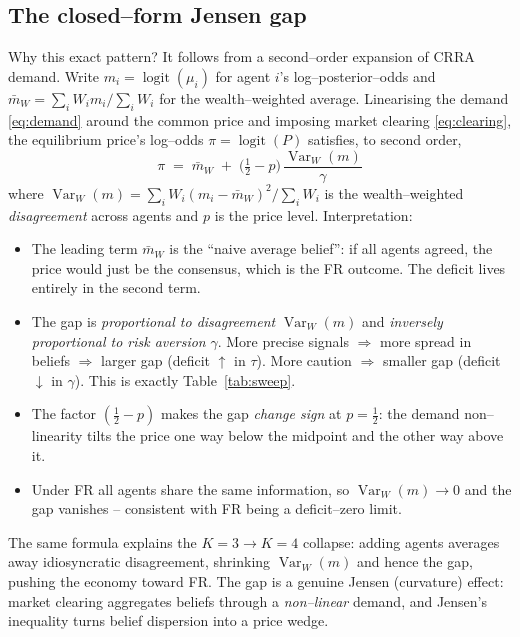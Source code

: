 \documentclass[11pt]{article}
\newcommand{\Var}{\operatorname{Var}}
\newcommand{\logit}{\operatorname{logit}}
\begin{document}
\subsection{The closed--form Jensen gap}

Why this exact pattern? It follows from a second--order expansion of CRRA
demand. Write $m_i=\logit(\mu_i)$ for agent $i$'s log--posterior--odds and
$\bar m_W=\sum_i W_i m_i/\sum_i W_i$ for the wealth--weighted average.
Linearising the demand \eqref{eq:demand} around the common price and
imposing market clearing \eqref{eq:clearing}, the equilibrium price's
log--odds $\pi=\logit(P)$ satisfies, to second order,
\begin{equation}
  \boxed{\;
  \pi \;=\; \bar m_W \;+\;
  \Big(\tfrac12-p\Big)\,\frac{\Var_W(m)}{\gamma}\; }
  \label{eq:jensen}
\end{equation}
where $\Var_W(m)=\sum_i W_i (m_i-\bar m_W)^2/\sum_i W_i$ is the
wealth--weighted \emph{disagreement} across agents and $p$ is the price
level. Interpretation:
\begin{itemize}
\item The leading term $\bar m_W$ is the ``naive average belief'': if all
  agents agreed, the price would just be the consensus, which is the FR
  outcome. The deficit lives entirely in the second term.
\item The gap is \emph{proportional to disagreement} $\Var_W(m)$ and
  \emph{inversely proportional to risk aversion} $\gamma$. More precise
  signals $\Rightarrow$ more spread in beliefs $\Rightarrow$ larger gap
  (deficit $\uparrow$ in $\tau$). More caution $\Rightarrow$ smaller gap
  (deficit $\downarrow$ in $\gamma$). This is exactly Table~\ref{tab:sweep}.
\item The factor $(\tfrac12-p)$ makes the gap \emph{change sign} at
  $p=\tfrac12$: the demand non--linearity tilts the price one way below the
  midpoint and the other way above it.
\item Under FR all agents share the same information, so $\Var_W(m)\to0$ and
  the gap vanishes -- consistent with FR being a deficit--zero limit.
\end{itemize}
The same formula explains the $K=3\to K=4$ collapse: adding agents averages
away idiosyncratic disagreement, shrinking $\Var_W(m)$ and hence the gap,
pushing the economy toward FR. The gap is a genuine Jensen (curvature)
effect: market clearing aggregates beliefs through a \emph{non--linear}
demand, and Jensen's inequality turns belief dispersion into a price wedge.
\end{document}
